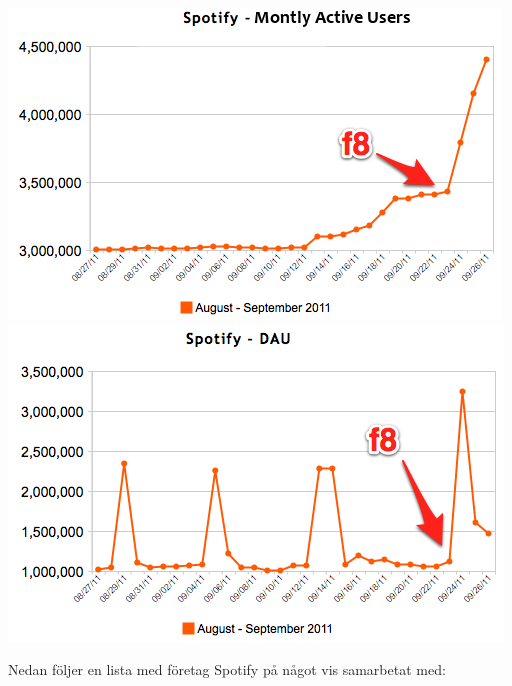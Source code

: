 \includegraphics[width=\linewidth]{images/MAU2011.png}
\includegraphics[width=\linewidth]{images/DAU2011.png}

Nedan följer en lista med företag Spotify på något vis samarbetat med:

